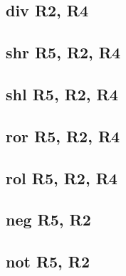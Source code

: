 \documentclass{article}
\begin{document}
    \subsection{div R2, R4} \label{DIV}
        
    \subsection{shr R5, R2, R4} \label{SHR}
        
    \subsection{shl R5, R2, R4} \label{SHL}
        
    \subsection{ror R5, R2, R4} \label{ROR}
        
    \subsection{rol R5, R2, R4} \label{ROL}
        
    \subsection{neg R5, R2} \label{NEG}
        
    \subsection{not R5, R2} \label{NOT}
        
\end{document}
